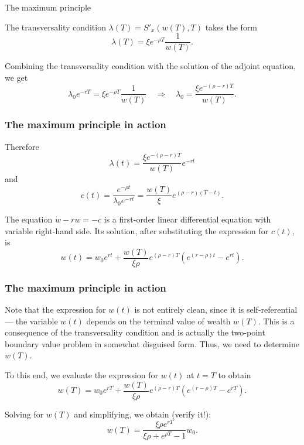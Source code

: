 \documentclass[10pt]{beamer}
\theoremstyle{definition}
\begin{document}
\begin{section}{The maximum principle}
\begin{frame}[fragile]
\begin{example}[cont.]
The transversality condition $ \lambda(T)=S'_x(w(T),T) $ takes the form \[ \lambda(T) = \xi e^{-\rho T}\dfrac{1}{w(T)}. \]

Combining the transversality condition with the solution of the adjoint equation, we get \[ \lambda_0 e^{-rT} = \xi e^{-\rho T}\dfrac{1}{w(T)} \quad \Rightarrow \quad \lambda_0 = \dfrac{\xi e^{-(\rho-r)T}}{w(T)}. \]
\end{example}
\end{frame}

\begin{frame}[fragile]
\frametitle{The maximum principle in action}
\addtocounter{theorem}{-1}
\begin{example}[cont.]
Therefore \[ \lambda(t)=\dfrac{\xi e^{-(\rho-r)T}}{w(T)} e^{-rt} \] and \[ c(t) = \dfrac{e^{-\rho t}}{\lambda_0 e^{-rt}} = \dfrac{w(T)}{\xi}e^{(\rho-r)(T-t)}.  \]\bigskip

The equation $ \dot{w} - rw = -c $ is a first-order linear differential equation with variable right-hand side. Its solution, after substituting the expression for $ c(t) $, is 
\[ w(t) = w_0 e^{rt} + \dfrac{w(T)}{\xi \rho}e^{(\rho-r)T}\left( e^{(r-\rho)t}-e^{rt} \right). \]

\end{example}
\end{frame}

\begin{frame}[fragile]
\frametitle{The maximum principle in action}
\addtocounter{theorem}{-1}
\begin{example}[cont.]
Note that the expression for $ w(t) $ is not entirely clean, since it is self-referential --- the variable $ w(t) $ depends on the terminal value of wealth $ w(T) $. This is a consequence of the transversality condition and is actually the two-point boundary value problem in somewhat disguised form. Thus, we need to determine $ w(T) $. \bigskip

To this end, we evaluate the expression for $ w(t) $ at $ t=T $ to obtain
\[ w(T) = w_0 e^{rT} + \dfrac{w(T)}{\xi \rho}e^{(\rho-r)T}\left( e^{(r-\rho)T}-e^{rT} \right). \]

Solving for $ w(T) $ and simplifying, we obtain (verify it!):
\[ w(T) = \dfrac{\xi \rho e^{rT}}{\xi \rho + e^{\rho T}-1}w_0. \]
\end{example}
\end{frame}


\end{section}
\end{document}
